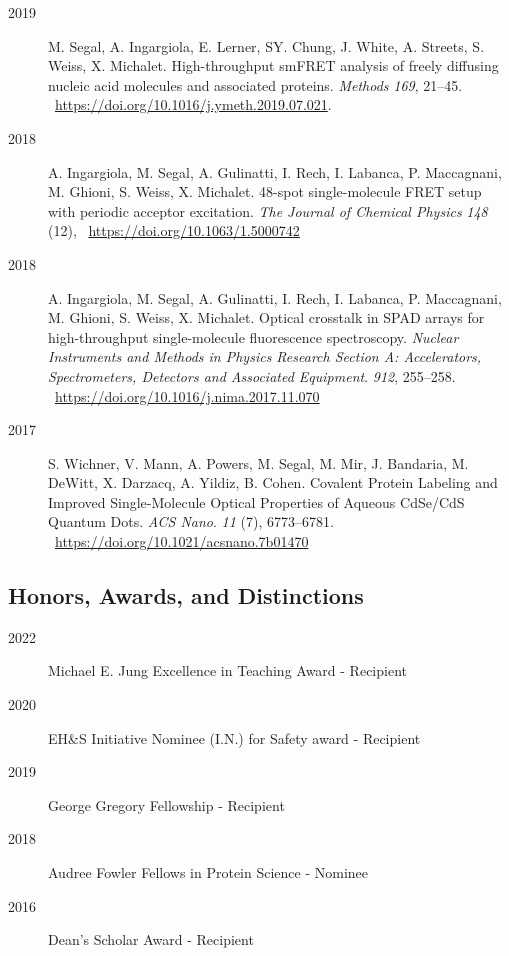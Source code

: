 \begin{description}
    \item[2019] M. Segal, A. Ingargiola, E. Lerner, SY. Chung, J. White, A. Streets, S. Weiss, X. Michalet. High-throughput smFRET analysis of freely diffusing nucleic acid molecules and associated proteins. \textit{Methods} \textit{169}, 21–45. ~\href{https://doi.org/10.1016/j.ymeth.2019.07.021}{https://doi.org/10.1016/j.ymeth.2019.07.021}.
    
    \item[2018] A. Ingargiola, M. Segal, A. Gulinatti, I. Rech, I. Labanca, P. Maccagnani, M. Ghioni, S. Weiss, X. Michalet. 48-spot single-molecule FRET setup with periodic acceptor excitation. \textit{The Journal of Chemical Physics} \textit{148} (12), ~\href{123304.https://doi.org/10.1063/1.5000742}{https://doi.org/10.1063/1.5000742}
    
    \item[2018] A. Ingargiola, M. Segal, A. Gulinatti, I. Rech, I. Labanca, P. Maccagnani, M. Ghioni, S. Weiss, X. Michalet. Optical crosstalk in SPAD arrays for high-throughput single-molecule fluorescence spectroscopy. \textit{Nuclear Instruments and Methods in Physics Research Section A: Accelerators, Spectrometers, Detectors and Associated Equipment}. \textit{912}, 255–258. ~\href{https://doi.org/10.1016/j.nima.2017.11.070}{https://doi.org/10.1016/j.nima.2017.11.070}
    
    \item[2017] S. Wichner, V. Mann, A. Powers, M. Segal, M. Mir, J. Bandaria, M. DeWitt, X. Darzacq, A. Yildiz, B. Cohen. Covalent Protein Labeling and Improved Single-Molecule Optical Properties of Aqueous CdSe/CdS Quantum Dots. \textit{ACS Nano}. \textit{11} (7), 6773–6781. ~\href{https://doi.org/10.1021/acsnano.7b01470}{https://doi.org/10.1021/acsnano.7b01470}
\end{description}
\vspace{1em}

\subsection*{Honors, Awards, and Distinctions}

\begin{description}
    \item[2022] Michael E. Jung Excellence in Teaching Award - Recipient
    \item[2020] EH\&S Initiative Nominee (I.N.) for Safety award - Recipient
    \item[2019] George Gregory Fellowship - Recipient
    \item[2018] Audree Fowler Fellows in Protein Science - Nominee
    \item[2016] Dean's Scholar Award - Recipient
\end{description}
